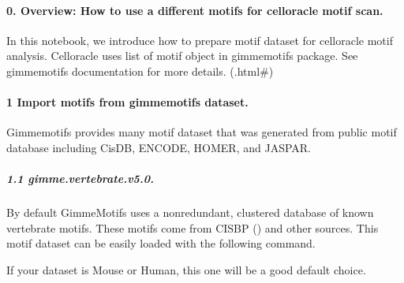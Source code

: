 \documentclass[letterpaper,10pt,english]{sphinxmanual}
\begin{document}
\paragraph{0. Overview: How to use a different motifs for celloracle motif scan.}
\label{\detokenize{notebooks/02_motif_scan/motif_data_preparation/01_How_to_load_motif_data:0.-Overview:-How-to-use-a-different-motifs-for-celloracle-motif-scan.}}\label{\detokenize{notebooks/02_motif_scan/motif_data_preparation/01_How_to_load_motif_data::doc}}
In this notebook, we introduce how to prepare motif dataset for celloracle motif analysis. Celloracle uses list of motif object in gimmemotifs package. See gimmemotifs documentation for more details. (.html\#)


\paragraph{1 Import motifs from gimmemotifs dataset.}
\label{\detokenize{notebooks/02_motif_scan/motif_data_preparation/01_How_to_load_motif_data:1-Import-motifs-from-gimmemotifs-dataset.}}
Gimmemotifs provides many motif dataset that was generated from public motif database including CisDB, ENCODE, HOMER, and JASPAR. 


\subparagraph{1.1 gimme.vertebrate.v5.0.}
\label{\detokenize{notebooks/02_motif_scan/motif_data_preparation/01_How_to_load_motif_data:1.1-gimme.vertebrate.v5.0.}}
By default GimmeMotifs uses a non\sphinxhyphen{}redundant, clustered database of known vertebrate motifs. These motifs come from CIS\sphinxhyphen{}BP () and other sources. This motif dataset can be easily loaded with the following command.

If your dataset is Mouse or Human, this one will be a good default choice.

{
\begin{sphinxVerbatim}[commandchars=\\\{\}]
\llap{\color{nbsphinxin}[1]:\,\hspace{\fboxrule}\hspace{\fboxsep}}
   
   

\PYG{p}{[}\PYG{p}{]}
\end{sphinxVerbatim}
}
\end{document}
